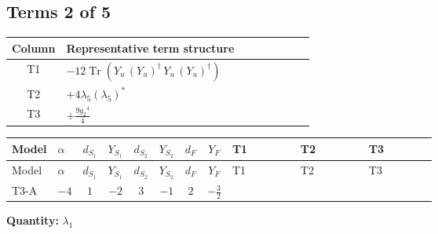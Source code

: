 \documentclass[8pt]{article}
\begin{document}
\begin{landscape}
\subsection*{Terms 2 of 5}
\begin{center}
\begin{tabular}{@{}c >{\raggedright\arraybackslash}p{0.82\linewidth}@{}}
\toprule
Column & Representative term structure \\
\midrule
T1 & \(\displaystyle -12 \operatorname{Tr}\!\left({Y_u}\,\left({Y_u}\right)^{\dagger}\,{Y_u}\,\left({Y_u}\right)^{\dagger}\right)\) \\
\midrule
T2 & \(\displaystyle +4 {\lambda_5} \left({\lambda_5}\right)^{*}\) \\
\midrule
T3 & \(\displaystyle +\frac{9 {g_2}^4}{4}\) \\
\midrule
\bottomrule
\end{tabular}
\end{center}
\smallskip
\tiny
\begin{longtable}{@{}llcccccc >{\raggedright\arraybackslash}p{0.21\linewidth} >{\raggedright\arraybackslash}p{0.21\linewidth} >{\raggedright\arraybackslash}p{0.21\linewidth}@{}}
\toprule
Model & $\alpha$ & $d_{S_1}$ & $Y_{S_1}$ & $d_{S_2}$ & $Y_{S_2}$ & $d_F$ & $Y_F$ & T1 & T2 & T3 \\
\midrule
\endfirsthead
\toprule
Model & $\alpha$ & $d_{S_1}$ & $Y_{S_1}$ & $d_{S_2}$ & $Y_{S_2}$ & $d_F$ & $Y_F$ & T1 & T2 & T3 \\
\midrule
\endhead
T3-A & $-4$ & $1$ & $-2$ & $3$ & $-1$ & $2$ & $-\frac{3}{2}$ & \scriptsize\adjustbox{max width=\linewidth}{$\begin{gathered} -12 \operatorname{Tr}\!\left({Y_u}\,\left({Y_u}\right)^{\dagger}\,{Y_u}\,\left({Y_u}\right)^{\dagger}\right)\end{gathered}$} & \scriptsize\adjustbox{max width=\linewidth}{$\begin{gathered} +4 {\lambda_5} \left({\lambda_5}\right)^{*}\end{gathered}$} & \scriptsize\adjustbox{max width=\linewidth}{$\begin{gathered} +\frac{9 {g_2}^4}{4}\end{gathered}$} \\
\midrule
\bottomrule
\end{longtable}
\clearpage
\noindent\textbf{Quantity: }$\lambda_1$\par\smallskip

\end{landscape}
\end{document}
